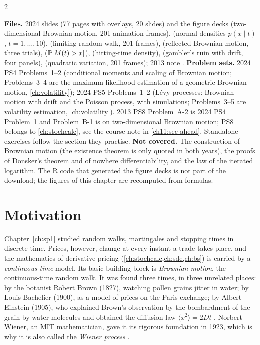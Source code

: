 \begin{paracol}{2}
\begin{sources}
\smallskip
\textbf{Files.} 2024 slides  (77 pages with overlays, 20 slides) and the figure decks
 (two-dimensional Brownian motion, 201 animation frames),  (normal densities $p(x\mid t)$,
$t=1,\dots,10$),  (limiting random walk, 201 frames),  (reflected Brownian motion, three trials),
 ($\mathbb{P}[M(t)>x]$),  (hitting-time density),  (gambler's ruin with drift, four
panels),  (quadratic variation, 201 frames); 2013 note .
\textbf{Problem sets.} 2024 PS4 Problems~1--2 (conditional moments and scaling of Brownian motion; Problems~3--4 are the
maximum-likelihood estimation of a geometric Brownian motion, \cref{ch:volatility}); 2024 PS5 Problems~1--2 (L\'evy processes:
Brownian motion with drift and the Poisson process, with simulations; Problems~3--5 are volatility estimation,
\cref{ch:volatility}). 2013 PS8 Problem~A-2 is 2024 PS4 Problem~1 and Problem~B-1 is on two-dimensional Brownian motion; PS8
belongs to \cref{ch:stochcalc}, see the course note in \cref{ch11:sec-ahead}. Standalone exercises follow the section they practise.
\textbf{Not covered.} The construction of Brownian motion (the existence theorem is only quoted in both years), the
proofs of Donsker's theorem and of nowhere differentiability, and the law of the iterated logarithm.
The R code that generated the figure decks is not part of the download; the figures of this chapter are recomputed from formulas.
\end{sources}

\section*{Motivation}
Chapter~\ref{ch:sp1} studied random walks, martingales and stopping times in discrete time. Prices, however,
change at every instant a trade takes place, and the mathematics of derivative pricing (\cref{ch:stochcalc,ch:sde,ch:bs}) is
carried by a \emph{continuous-time} model. Its basic building block is \emph{Brownian motion}, the continuous-time random walk.
It was found three times, in three unrelated places: by the botanist Robert Brown (1827), watching pollen grains jitter in
water; by Louis Bachelier (1900), as a model of prices on the Paris exchange; by Albert Einstein (1905), who explained
Brown's observation by the bombardment of the grain by water molecules and obtained the diffusion law
$\langle x^2\rangle=2Dt$ . Norbert Wiener, an MIT mathematician,
gave it its rigorous foundation in 1923, which is why it is also called the \emph{Wiener process}
.


\end{paracol}
